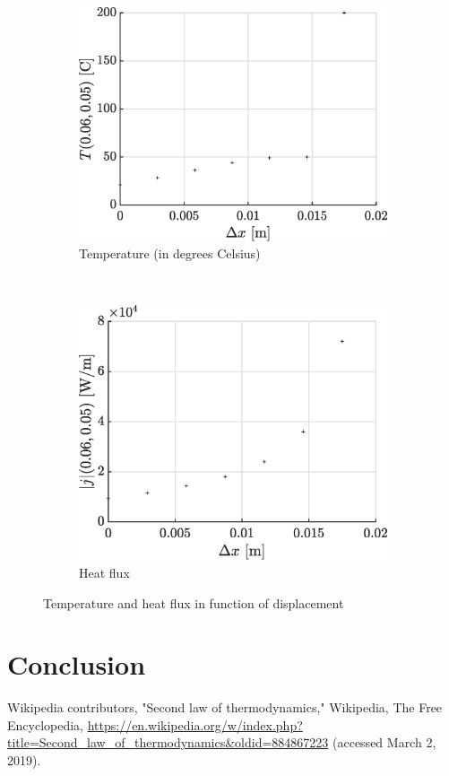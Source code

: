 \documentclass[a4paper,12pt,twoside]{article}
\begin{document}
\begin{figure}[h]
  \centering
  \begin{subfigure}[t]{0.45\textwidth}
    \includegraphics[width=\textwidth]{graphs/e_distT.eps}
    \caption{Temperature (in degrees Celsius)}
    \label{fig:e-T}
  \end{subfigure}
  ~
  \begin{subfigure}[t]{0.45\textwidth}
    \includegraphics[width=\textwidth]{graphs/e_distF.eps}
    \caption{Heat flux}
    \label{fig:e-T}
  \end{subfigure}
  \caption{Temperature and heat flux in function of displacement}
  \label{fig:e}
\end{figure}

\section{Conclusion}

\begin{thebibliography}{99}
   Wikipedia contributors, "Second law of thermodynamics," Wikipedia, The Free Encyclopedia, \url{https://en.wikipedia.org/w/index.php?title=Second_law_of_thermodynamics&oldid=884867223} (accessed March 2, 2019).


\end{thebibliography}
\end{document}
